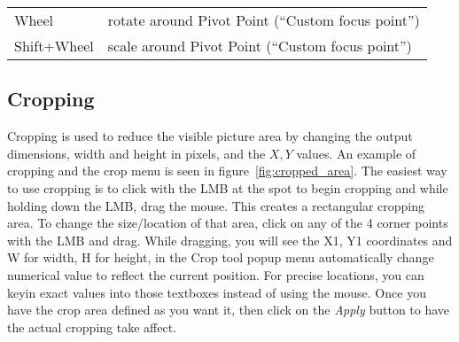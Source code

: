 \vspace{2ex}
\begin{tabular}{ l  l }
    \hline			
    Wheel & rotate around Pivot Point (“Custom focus point”) \\
    Shift+Wheel & scale around Pivot Point (“Custom focus point”) \\       
    \hline  
\end{tabular}

\vspace{2ex}

\subsection{Cropping}%
\label{sub:cropping}

Cropping is used to reduce the visible picture area by changing the output dimensions, width and
height in pixels, and the $X, Y$ values. An example of cropping and the crop menu is seen in
figure~\ref{fig:cropped_area}.
The easiest way to use cropping is to click with the LMB 
at the spot to begin cropping and while holding down the LMB, drag the mouse. This creates a rectangular
cropping area.  To change the size/location of that area, click on any of the 4 corner points
with the LMB and drag.  While dragging, you will see 
the X1, Y1 coordinates and W for width, H for height, in the Crop tool popup menu
automatically change numerical value to reflect the current position. For precise locations, you
can keyin exact values into those textboxes instead of using the mouse.
Once you have the crop area defined as you want it, then click on the \textit{Apply} button to have
the actual cropping take affect.

